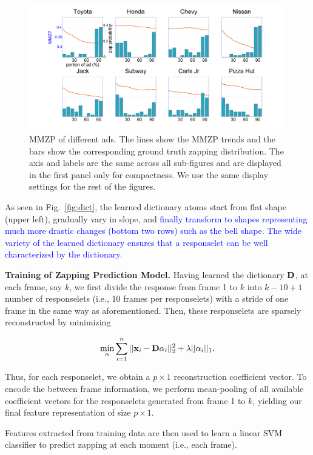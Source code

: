 \documentclass[twoside,leqno,twocolumn]{article}
\newcommand{\SFAdd}[1]{\textcolor{blue}{#1}}
\begin{document}
\begin{figure}[t]
	\centering
		\includegraphics[width=.8\textwidth]{fig/ad.png}
	\caption{MMZP of different ads. The lines show the MMZP trends and the bars show the corresponding ground truth zapping distribution. The axis and labels are the same across all sub-figures and are displayed in the first panel only for compactness. We use the same display settings for the rest of the figures.}
	\label{fig:ad}
\end{figure}

As seen in Fig.~\ref{fig:dict}, the learned dictionary atoms start from flat shape (upper left), gradually vary in slope, and \SFAdd{finally transform to shapes representing much more drastic changes (bottom two rows) such as the bell shape}. \SFAdd{The wide variety of the learned dictionary ensures that a responselet can be well characterized by the dictionary}. 


\noindent \textbf{Training of Zapping Prediction Model.} Having learned the dictionary ${\bf D}$, at each frame, say $k$, we first divide the response from frame 1 to $k$ into $k-10+1$ number of responselets (i.e., 10 frames per responselets) with a stride of one frame in the same way as aforementioned. Then, these responselets are sparsely reconstructed by minimizing

\begin{align}
\label{eq:solve_alpha}
\min_{\alpha} \sum_{i=1}^n ||{\bf x}_i-{\bf D}\alpha_i||^2_2 +\lambda ||\alpha_i||_1.
\end{align}

Thus, for each responselet, we obtain a $p\times 1$ reconstruction coefficient vector. To encode the between frame information, we perform mean-pooling of all available coefficient vectors for the responselets generated from frame 1 to $k$, yielding our final feature representation of size $p\times 1$. 

\SFAdd{

}


Features extracted from training data are then used to learn a linear SVM classifier to predict zapping at each moment (i.e., each frame).
\end{document}
